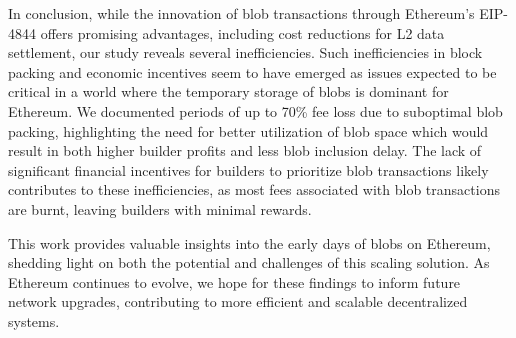 In conclusion,
while the innovation of blob transactions through Ethereum's EIP-4844 offers promising advantages, including cost reductions for L2 data settlement, our study reveals several inefficiencies.
Such inefficiencies in block packing and economic incentives seem to have emerged as issues expected to be critical in a world where the temporary storage of blobs is dominant for Ethereum. We documented periods of up to 70\% fee loss due to suboptimal blob packing, highlighting the need for better utilization of blob space which would result in both higher builder profits and less blob inclusion delay. The lack of significant financial incentives for builders to prioritize blob transactions likely contributes to these inefficiencies, as most fees associated with blob transactions are burnt, leaving builders with minimal rewards.

This work provides valuable insights into the early days of blobs on Ethereum, shedding light on both the potential and challenges of this scaling solution. As Ethereum continues to evolve, we hope for these findings to inform future network upgrades, contributing to more efficient and scalable decentralized systems.

